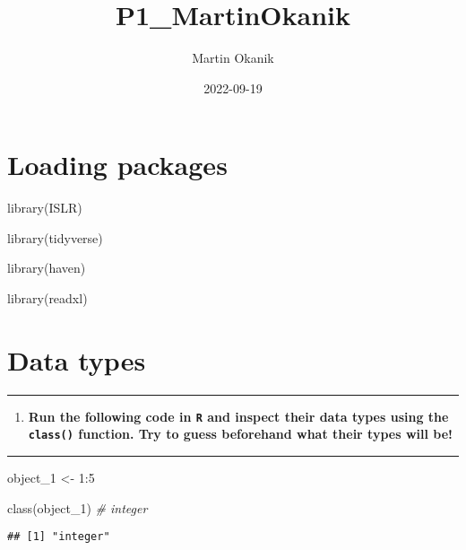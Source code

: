 \documentclass[
]{article}
\title{P1\_MartinOkanik}
\author{Martin Okanik}
\date{2022-09-19}
\newenvironment{Shaded}{\begin{snugshade}}{\end{snugshade}}
\newcommand{\CommentTok}[1]{\textcolor[rgb]{0.56,0.35,0.01}{\textit{#1}}}
\newcommand{\DecValTok}[1]{\textcolor[rgb]{0.00,0.00,0.81}{#1}}
\newcommand{\FunctionTok}[1]{\textcolor[rgb]{0.00,0.00,0.00}{#1}}
\newcommand{\NormalTok}[1]{#1}
\newcommand{\OtherTok}[1]{\textcolor[rgb]{0.56,0.35,0.01}{#1}}
\newcommand{\SpecialCharTok}[1]{\textcolor[rgb]{0.00,0.00,0.00}{#1}}
\providecommand{\tightlist}{%
  \setlength{\itemsep}{0pt}\setlength{\parskip}{0pt}}
\begin{document}
\maketitle

\hypertarget{loading-packages}{%
\section{Loading packages}\label{loading-packages}}

\begin{Shaded}
\begin{Highlighting}[]
\FunctionTok{library}\NormalTok{(ISLR)}

\FunctionTok{library}\NormalTok{(tidyverse)}

\FunctionTok{library}\NormalTok{(haven)}

\FunctionTok{library}\NormalTok{(readxl)}
\end{Highlighting}
\end{Shaded}

\hypertarget{data-types}{%
\section{Data types}\label{data-types}}

\begin{center}\rule{0.5\linewidth}{0.5pt}\end{center}

\begin{enumerate}
\def\labelenumi{\arabic{enumi}.}
\tightlist
\item
  \textbf{Run the following code in \texttt{R} and inspect their data
  types using the \texttt{class()} function. Try to guess beforehand
  what their types will be!}
\end{enumerate}

\begin{center}\rule{0.5\linewidth}{0.5pt}\end{center}

\begin{Shaded}
\begin{Highlighting}[]
\NormalTok{object\_1 }\OtherTok{\textless{}{-}} \DecValTok{1}\SpecialCharTok{:}\DecValTok{5}

\FunctionTok{class}\NormalTok{(object\_1) }\CommentTok{\# integer}
\end{Highlighting}
\end{Shaded}

\begin{verbatim}
## [1] "integer"
\end{verbatim}
\end{document}
